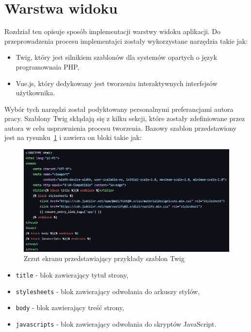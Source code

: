 \documentclass[12pt,twoside]{book}
\newcommand{\captionvspace}{\vspace{6pt}}
\begin{document}
    \section{Warstwa widoku}

    Rozdział ten opisuje sposób implementacji warstwy widoku aplikacji. Do przeprowadzenia procesu implementajci zostały wykorzystane narzędzia takie jak:

    \begin{itemize}
        \item Twig, który jest silnikiem szablonów dla systemów opartych o język programownaia PHP,
        \item Vue.js, który dedykowany jest tworzeniu interaktywnych interfejsów użytkownika.
    \end{itemize}


    Wybór tych narzędzi został podyktowany personalnymi preferancjami autora pracy. Szablony Twig skłądają się z kilku sekcji, które zostały zdefiniowane przez autora w celu usprawnienia procesu tworzenia. Bazowy szablon przedstawiony jest na rysunku~\ref{fig:twig-base-template} i zawiera on bloki takie jak:

    \begin{figure}[ht]
        \centering
        \includegraphics[width=\textwidth]{includes/images/twig-base-template.png}
        \captionvspace
        \caption{Zrzut ekranu przedstawiający przykłady szablon Twig}
        \label{fig:twig-base-template}
    \end{figure}

    \begin{itemize}
        \item \texttt{title} - blok zawierający tytuł strony,
        \item \texttt{stylesheets} - blok zawierający odwołania do arkuszy stylów,
        \item \texttt{body} - blok zawierający treść strony,
        \item \texttt{javascripts} - blok zawierający odwołania do skryptów JavaScript.
    \end{itemize}
\end{document}
